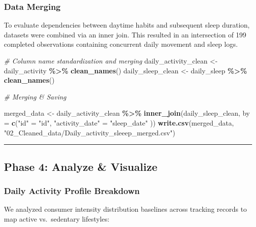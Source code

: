 \documentclass[
]{article}
\newenvironment{Shaded}{\begin{snugshade}}{\end{snugshade}}
\newcommand{\AttributeTok}[1]{\textcolor[rgb]{0.13,0.29,0.53}{#1}}
\newcommand{\CommentTok}[1]{\textcolor[rgb]{0.56,0.35,0.01}{\textit{#1}}}
\newcommand{\FunctionTok}[1]{\textcolor[rgb]{0.13,0.29,0.53}{\textbf{#1}}}
\newcommand{\NormalTok}[1]{#1}
\newcommand{\OtherTok}[1]{\textcolor[rgb]{0.56,0.35,0.01}{#1}}
\newcommand{\SpecialCharTok}[1]{\textcolor[rgb]{0.81,0.36,0.00}{\textbf{#1}}}
\newcommand{\StringTok}[1]{\textcolor[rgb]{0.31,0.60,0.02}{#1}}
\begin{document}
\subsubsection{Data Merging}\label{data-merging}

To evaluate dependencies between daytime habits and subsequent sleep
duration, datasets were combined via an inner join. This resulted in an
intersection of 199 completed observations containing concurrent daily
movement and sleep logs.

\begin{Shaded}
\begin{Highlighting}[]
\CommentTok{\# Column name standardization and merging}
\NormalTok{daily\_activity\_clean }\OtherTok{\textless{}{-}}\NormalTok{ daily\_activity }\SpecialCharTok{\%\textgreater{}\%} \FunctionTok{clean\_names}\NormalTok{()}
\NormalTok{daily\_sleep\_clean }\OtherTok{\textless{}{-}}\NormalTok{ daily\_sleep }\SpecialCharTok{\%\textgreater{}\%} \FunctionTok{clean\_names}\NormalTok{()}

\CommentTok{\# Merging \& Saving}

\NormalTok{merged\_data }\OtherTok{\textless{}{-}}\NormalTok{ daily\_activity\_clean }\SpecialCharTok{\%\textgreater{}\%} \FunctionTok{inner\_join}\NormalTok{(daily\_sleep\_clean, }\AttributeTok{by =} \FunctionTok{c}\NormalTok{(}\StringTok{"id"} \OtherTok{=} \StringTok{"id"}\NormalTok{, }\StringTok{"activity\_date"} \OtherTok{=} \StringTok{"sleep\_date"}\NormalTok{ ))}
\FunctionTok{write.csv}\NormalTok{(merged\_data, }\StringTok{"02\_Cleaned\_data/Daily\_activity\_sleeep\_merged.csv"}\NormalTok{)}
\end{Highlighting}
\end{Shaded}

\begin{center}\rule{0.5\linewidth}{0.5pt}\end{center}

\subsection{Phase 4: Analyze \&
Visualize}\label{phase-4-analyze-visualize}

\subsubsection{Daily Activity Profile
Breakdown}\label{daily-activity-profile-breakdown}

We analyzed consumer intensity distribution baselines across tracking
records to map active vs.~sedentary lifestyles:
\end{document}
